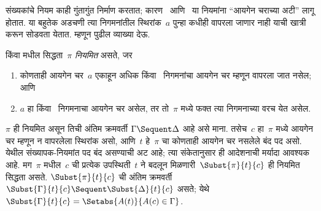 संख्यकांचे नियम काही गुंतागुंत निर्माण करतात;
कारण~\LeftR{\lexists} आणि~\RightR{\lforall} या
नियमांना ``आयगेन चराच्या अटी'' लागू होतात. या
बहुतेक अडचणी त्या निगमनांतील स्थिरांक~$a$
पुन्हा कधीही वापरला जाणार नाही याची खात्री करून
सोडवता येतात. म्हणून पुढील व्याख्या देऊ.

\begin{defn}
 किंवा  मधील सिद्धता~$\pi$
\emph{नियमित} असते, जर
\begin{enumerate}
  \item कोणताही आयगेन चर~$a$ एकाहून अधिक
  \LeftR{\lexists} किंवा~\RightR{\lforall} निगमनांचा
  आयगेन चर म्हणून वापरला जात नसेल; आणि
  \item $a$ हा \LeftR{\lexists} किंवा~\RightR{\lforall}
  निगमनाचा आयगेन चर असेल, तर तो~$\pi$ मध्ये
  फक्त त्या निगमनाच्या वरच येत असेल.
\end{enumerate}
\end{defn}

\begin{lem}\label{pt:seq:qua:lem:subst-regular} $\pi$ ही
नियमित असून तिची अंतिम क्रमवर्ती $\Gamma \Sequent
\Delta$ आहे असे माना. तसेच~$c$ हा~$\pi$ मध्ये
आयगेन चर म्हणून न वापरलेला स्थिरांक असो,
आणि~$t$ हे~$\pi$ चा कोणताही आयगेन चर नसलेले बंद पद असो.
येथील संख्यापक-नियमांत पद बंद असण्याची अट आहे;
त्या संकेतानुसार ही आदेशनाची मर्यादा आवश्यक आहे.
मग~$\pi$ मधील~$c$ ची प्रत्येक उपस्थिती~$t$ ने
बदलून मिळणारी~$\Subst{\pi}{t}{c}$ ही नियमित
सिद्धता असते. $\Subst{\pi}{t}{c}$ ची अंतिम क्रमवर्ती
$\Subst{\Gamma}{t}{c}
\Sequent \Subst{\Delta}{t}{c}$ असते; येथे
$\Subst{\Gamma}{t}{c} =
\Setabs{A(t)}{A(c) \in \Gamma}$.
\end{lem}

